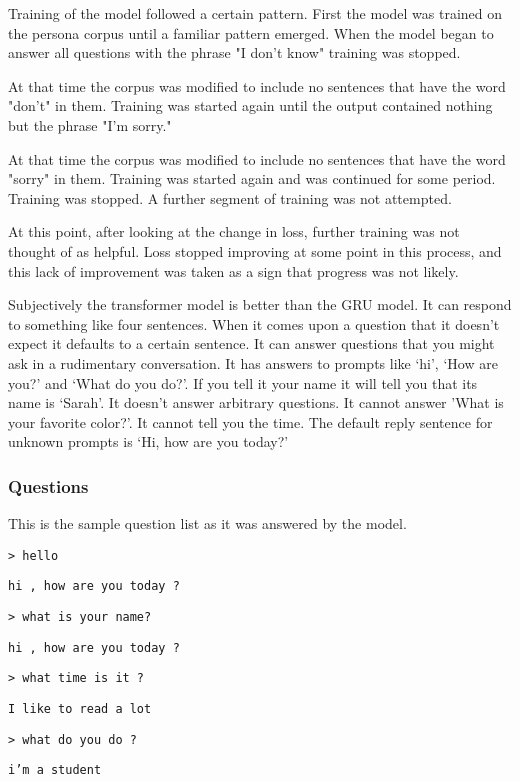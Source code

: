 Training of the model followed a certain pattern. First the model was trained on the persona corpus until a familiar pattern emerged. When the model began to answer all questions with the 
phrase "I don't know" training was stopped. 

At that time the corpus was modified to include no 
sentences that have the word "don't" in them. Training was started again until the output contained nothing but the phrase "I'm sorry." 

At that time the corpus was modified to include no sentences that have the word "sorry" in them.
Training was started again and was continued for some period. Training was stopped. A further segment of training was not attempted. 

At this point, after looking at the change in loss, further training was not
thought of as helpful. Loss stopped improving at some point in this process, and this lack of
improvement was taken as a sign that progress was not likely.

Subjectively the transformer model is better than the GRU model. It can respond to something like
four sentences. When it comes upon a question that it doesn't expect it defaults to a certain sentence. It can answer questions that you might ask in a rudimentary conversation. It has answers to prompts like `hi', `How are you?' and `What do you do?'. If you tell it your name it will tell you that its name is `Sarah'. It doesn't answer arbitrary questions. It cannot answer 'What is your favorite color?'. It cannot tell you the time. The default reply sentence for unknown prompts is `Hi, how are you today?'


\subsubsection*{Questions}
This is the sample question list as it was answered by the model.

\texttt{> hello}

\texttt{hi , how are you today ?}

 \texttt{> what is your name?}

\texttt{hi , how are you today ?}

\texttt{> what time is it ?}

\texttt{I like to read a lot}

 \texttt{> what do you do ?}

\texttt{i'm a student} 

